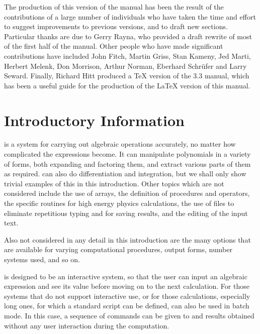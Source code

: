The production of this version of the manual has been the result of the
contributions of a large number of individuals who have taken the time and
effort to suggest improvements to previous versions, and to draft new
sections.  Particular thanks are due to Gerry Rayna, who provided a draft
rewrite of most of the first half of the manual.  Other people who have
made significant contributions have included John Fitch, Martin Griss,
Stan Kameny, Jed Marti, Herbert Melenk, Don Morrison, Arthur Norman,
Eberhard Schr\"ufer and Larry Seward.  Finally, Richard Hitt produced a {\TeX}
version of the {\REDUCE} 3.3 manual, which has been a useful guide for the
production of the {\LaTeX} version of this manual.

\chapter{Introductory Information}

 is a system for carrying out algebraic
operations accurately, no matter how complicated the expressions become.
It can manipulate polynomials in a variety of forms, both expanding and
factoring them, and extract various parts of them as required.  {\REDUCE} can
also do differentiation and integration, but we shall only show trivial
examples of this in this introduction.  Other topics which are not
considered include the use of arrays, the definition of procedures and
operators, the specific routines for high energy physics calculations, the
use of files to eliminate repetitious typing and for saving results, and
the editing of the input text.

Also not considered in any detail in this introduction are the many options
that are available for varying computational procedures, output forms,
number systems used, and so on.

{\REDUCE} is designed to be an interactive system, so that the user can input
an algebraic expression and see its value before moving on to the next
calculation.  For those systems that do not support interactive use, or
for those calculations, especially long ones, for which a standard script
can be defined, {\REDUCE} can also be used in batch mode. In this case,
a sequence of commands can be given to {\REDUCE} and results obtained
without any user interaction during the computation.

